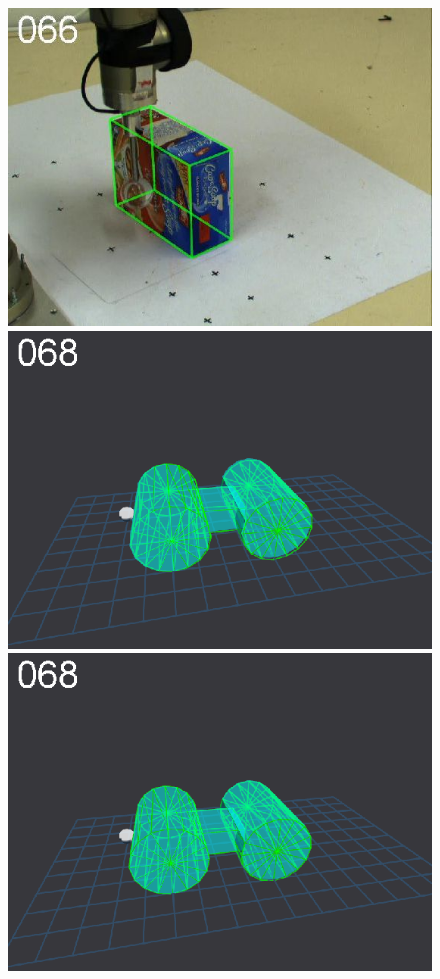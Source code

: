 \begin{figure}[tbp]
{\includegraphics[width=\imgCXwid]{images/C1_LWPR1_87_1}
\includegraphics[width=\imgCXwid]{images/C5_1exp_6_1}
\includegraphics[width=\imgCXwid]{images/C5_2exp_6_1}
}
\end{figure}
